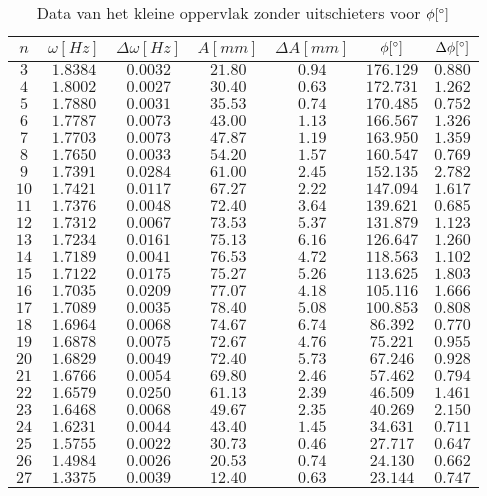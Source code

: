 \documentclass[12pt,a4]{article}
\begin{document}
\begin{table}[h]
\centering
\caption{Data van het kleine oppervlak zonder uitschieters voor $\phi [\degree]$}
\begin{tabular}{c | c | c | c | c | c | c }
$ n $&$\omega [Hz] $&$ \Delta\omega [Hz] $&$ A [mm] $&$ \Delta A [mm] $&$ \phi [\degree] $&$ \Delta \phi [\degree] $\\
\hline
$ 3 $&$ 1.8384 $&$ 0.0032 $&$ 21.80 $&$ 0.94 $&$ 176.129 $&$ 0.880 $\\
$ 4 $&$ 1.8002 $&$ 0.0027 $&$ 30.40 $&$ 0.63 $&$ 172.731 $&$ 1.262 $\\
$ 5 $&$ 1.7880 $&$ 0.0031 $&$ 35.53 $&$ 0.74 $&$ 170.485 $&$ 0.752 $\\
$ 6 $&$ 1.7787 $&$ 0.0073 $&$ 43.00 $&$ 1.13 $&$ 166.567 $&$ 1.326 $\\
$ 7 $&$ 1.7703 $&$ 0.0073 $&$ 47.87 $&$ 1.19 $&$ 163.950 $&$ 1.359 $\\
$ 8 $&$ 1.7650 $&$ 0.0033 $&$ 54.20 $&$ 1.57 $&$ 160.547 $&$ 0.769 $\\
$ 9 $&$ 1.7391 $&$ 0.0284 $&$ 61.00 $&$ 2.45 $&$ 152.135 $&$ 2.782 $\\
$ 10 $&$ 1.7421 $&$ 0.0117 $&$ 67.27 $&$ 2.22 $&$ 147.094 $&$ 1.617 $\\
$ 11 $&$ 1.7376 $&$ 0.0048 $&$ 72.40 $&$ 3.64 $&$ 139.621 $&$ 0.685 $\\
$ 12 $&$ 1.7312 $&$ 0.0067 $&$ 73.53 $&$ 5.37 $&$ 131.879 $&$ 1.123 $\\
$ 13 $&$ 1.7234 $&$ 0.0161 $&$ 75.13 $&$ 6.16 $&$ 126.647 $&$ 1.260 $\\
$ 14 $&$ 1.7189 $&$ 0.0041 $&$ 76.53 $&$ 4.72 $&$ 118.563 $&$ 1.102 $\\
$ 15 $&$ 1.7122 $&$ 0.0175 $&$ 75.27 $&$ 5.26 $&$ 113.625 $&$ 1.803 $\\
$ 16 $&$ 1.7035 $&$ 0.0209 $&$ 77.07 $&$ 4.18 $&$ 105.116 $&$ 1.666 $\\
$ 17 $&$ 1.7089 $&$ 0.0035 $&$ 78.40 $&$ 5.08 $&$ 100.853 $&$ 0.808 $\\
$ 18 $&$ 1.6964 $&$ 0.0068 $&$ 74.67 $&$ 6.74 $&$ 86.392 $&$ 0.770 $\\
$ 19 $&$ 1.6878 $&$ 0.0075 $&$ 72.67 $&$ 4.76 $&$ 75.221 $&$ 0.955 $\\
$ 20 $&$ 1.6829 $&$ 0.0049 $&$ 72.40 $&$ 5.73 $&$ 67.246 $&$ 0.928 $\\
$ 21 $&$ 1.6766 $&$ 0.0054 $&$ 69.80 $&$ 2.46 $&$ 57.462 $&$ 0.794 $\\
$ 22 $&$ 1.6579 $&$ 0.0250 $&$ 61.13 $&$ 2.39 $&$ 46.509 $&$ 1.461 $\\
$ 23 $&$ 1.6468 $&$ 0.0068 $&$ 49.67 $&$ 2.35 $&$ 40.269 $&$ 2.150 $\\
$ 24 $&$ 1.6231 $&$ 0.0044 $&$ 43.40 $&$ 1.45 $&$ 34.631 $&$ 0.711 $\\
$ 25 $&$ 1.5755 $&$ 0.0022 $&$ 30.73 $&$ 0.46 $&$ 27.717 $&$ 0.647 $\\
$ 26 $&$ 1.4984 $&$ 0.0026 $&$ 20.53 $&$ 0.74 $&$ 24.130 $&$ 0.662 $\\
$ 27 $&$ 1.3375 $&$ 0.0039 $&$ 12.40 $&$ 0.63 $&$ 23.144 $&$ 0.747 $\\
\end{tabular}
\end{table}
\end{document}
